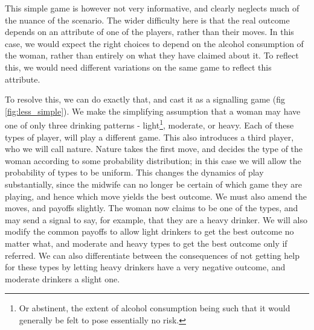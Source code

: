 This simple game is however not very informative, and clearly neglects much of the nuance of the scenario. The wider difficulty here is that the real outcome depends on an attribute of one of the players, rather than their moves. In this case, we would expect the right choices to depend on the alcohol consumption of the woman, rather than entirely on what they have claimed about it.
To reflect this, we would need different variations on the same game to reflect this attribute. 

To resolve this, we can do exactly that, and cast it as a signalling game (fig \ref{fig:less_simple}). We make the simplifying assumption that a woman may have one of only three drinking patterns - light\footnote{Or abstinent, the extent of alcohol consumption being such that it would generally be felt to pose essentially no risk.}, moderate, or heavy. Each of these types of player, will play a different game. This also introduces a third player, who we will call nature. Nature takes the first move, and decides the type of the woman according to some probability distribution; in this case we will allow the probability of types to be uniform. 
This changes the dynamics of play substantially, since the midwife can no longer be certain of which game they are playing, and hence which move yields the best outcome. We must also amend the moves, and payoffs slightly. The woman now claims to be one of the types, and may send a signal to say, for example, that they are a heavy drinker. We will also modify the common payoffs to allow light drinkers to get the best outcome no matter what, and moderate and heavy types to get the best outcome only if referred. We can also differentiate between the consequences of not getting help for these types by letting heavy drinkers have a very negative outcome, and moderate drinkers a slight one.

